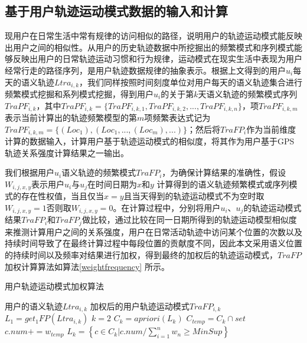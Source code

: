 \subsection{基于用户轨迹运动模式数据的输入和计算}
现用户在日常生活中常有规律的访问相似的路径，说明用户的轨迹运动模式能反映出用户之间的相似性。从用户的历史轨迹数据中所挖掘出的频繁模式和序列模式能够反映出用户的日常轨迹运动习惯和行为规律，运动模式在现实生活中表现为用户经常行走的路径序列，是用户轨迹数据规律的抽象表示。根据上文得到的用户$u_{i}$每天的语义轨迹$Ltra_{i,k}$，我们同样按照时间刻度单位对用户每天的语义轨迹集合进行频繁模式挖掘和系列模式挖掘，得到用户$u_{i}$的关于第$k$天语义轨迹的频繁模式序列$TraPF_{i,k}$，其中$TraPF_{i,k}=\{ TraPF_{i,k,1},TraPF_{i,k,2},...,TraPF_{i,k,n} \}$，项$TraPF_{i,k,m}$表示当前计算出的轨迹频繁模型的第$m$项频繁表达式记为$TraPF_{i,k,m}=\{  (Loc_{1}),(Loc_{1},...,(Loc_{m}),...)  \}$；然后将$TraFP_{i}$作为当前维度计算的数据输入，计算用户基于轨迹运动模式的相似度，将其作为用户基于GPS轨迹关系强度计算结果之一输出。
\par 我们根据用户$u_{i}$语义轨迹的频繁模式$TraFP_{i}$，为确保计算结果的准确性，假设$W_{i,j,x,y}$表示用户$u_{i}$与$u_{j}$在时间日期为$x$和$y$ 计算得到的语义轨迹频繁模式或序列模式的存在性权值，当且仅当$x=y$且当天得到的轨迹运动模式不为空时取$W_{i,j,x,y}=1$否则取$W_{i,j,x,y}=0$。在计算过程中，分别将用户$u_{i}$、$u_{j}$的轨迹运动模式结果$TraFP_{i}$和$TraFP_{j}$做比较，通过比较在同一日期所得到的轨迹运动模型相似度来推测计算用户之间的关系强度，用户在日常活动轨迹中访问某个位置的次数以及持续时间导致了在最终计算过程中每段位置的贡献度不同，因此本文采用语义位置的持续时间以及频率对结果进行加权，得到最终的加权后的轨迹运动模式，$TraFP$加权计算算法如算法\ref{weightfrequency} 所示。
\begin{algorithm}[H]
    \wuhao
    \caption{用户轨迹运动模式加权算法}
    \label{weightfrequency}
    \begin{algorithmic}[1] %
    \REQUIRE 用户的语义轨迹$Ltra_{i,k}$
    \ENSURE 加权后的用户轨迹运动模式$TraFP_{i,k}$
    \STATE $L_{1}= get_{1}FP(Ltra_{i,k})$
    \STATE $k=2$
    \STATE $C_{k}=apriori(L_{k})$
    \STATE $C_{temp}=C_{k}\cap set$
    \STATE $c.num+=w_{temp}$
    \ENDFOR
    \ENDFOR	
    \STATE \mbox{{$L_{k} = \left \{   c\in C_{k}  |  c.num /\sum_{i=1}^{n}w_{n} \geq MinSup  \right \}$ }}
    \ENDWHILE
\end{algorithmic}
\end{algorithm}
